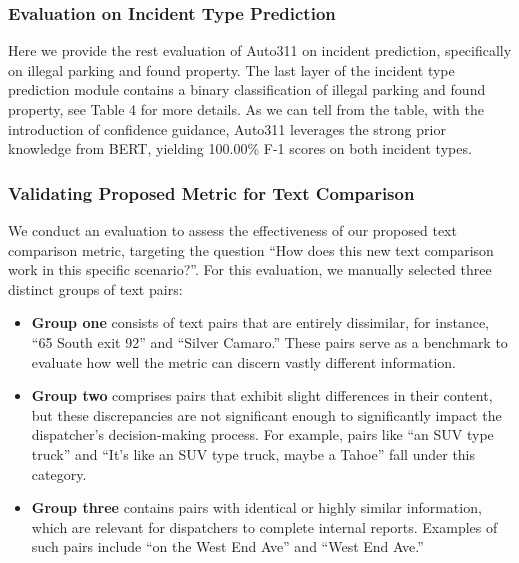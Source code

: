 \subsubsection{Evaluation on Incident Type Prediction}
Here we provide the rest evaluation of Auto311 on incident prediction, specifically on illegal parking and found property. The last layer of the incident type prediction module contains a binary classification of illegal parking and found property, see Table 4 for more details. As we can tell from the table, with the introduction of confidence guidance, Auto311 leverages the strong prior knowledge from BERT, yielding 100.00\% F-1 scores on both incident types.





\subsubsection{Validating Proposed Metric for Text Comparison}

We conduct an evaluation to assess the effectiveness of our proposed text comparison metric, targeting the question ``How does this new text comparison work in this specific scenario?''. For this evaluation, we manually selected three distinct groups of text pairs:
\begin{itemize}
    \item \textbf{Group one} consists of text pairs that are entirely dissimilar, for instance, ``65 South exit 92'' and ``Silver Camaro.'' These pairs serve as a benchmark to evaluate how well the metric can discern vastly different information.
    \item \textbf{Group two} comprises pairs that exhibit slight differences in their content, but these discrepancies are not significant enough to significantly impact the dispatcher's decision-making process. For example, pairs like ``an SUV type truck'' and ``It's like an SUV type truck, maybe a Tahoe'' fall under this category.
    \item \textbf{Group three} contains pairs with identical or highly similar information, which are relevant for dispatchers to complete internal reports. Examples of such pairs include ``on the West End Ave'' and ``West End Ave.''
\end{itemize}

